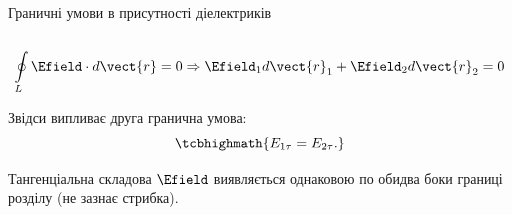 \documentclass[]{beamer}
\begin{document}
\begin{frame}{Граничні умови в присутності діелектриків}{}
\begin{onlyenv}
\begin{columns}
\begin{column}{0.6\linewidth}
\begin{block}{}
				\end{block}
			\end{column}
			\begin{column}{0.4\linewidth}\centering
				
			\end{column}
		\end{columns}
		\begin{block}{}\scriptsize
			\begin{equation*}
				\oint\limits_L \Efield\cdot d\vect{r} = 0 \Rightarrow \Efield_1 d\vect{r}_1 +
				\Efield_2 d\vect{r}_2 = 0
			\end{equation*}
		\end{block}
		\begin{block}{}
			Звідси випливає друга гранична умова:
			\begin{equation*}
				\tcbhighmath{
					E_{1\tau} = E_{2\tau}.
				}
			\end{equation*}
		\end{block}
		\begin{alertblock}{}\justifying\scriptsize
			Тангенціальна складова $\Efield$ виявляється однаковою по обидва боки границі розділу
			(не
			зазнає стрибка).
		\end{alertblock}
	\end{onlyenv}
\end{frame}
\end{document}
